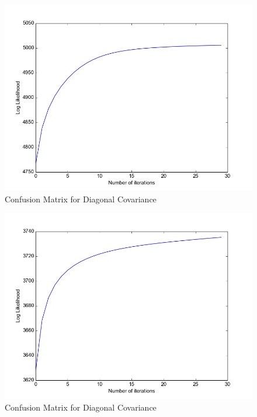 \documentclass[11pt,a4paper]{article}
\begin{document}
\begin{minipage}[b]{0.5\textwidth}
\begin{figure}[H]
  \centering
  \includegraphics[width=.8\linewidth]{Figures/likelihood_HW4.png}
\caption{Confusion Matrix for Diagonal Covariance}
  \label{fig:sfig1}
\end{figure}%
\end{minipage}
\begin{minipage}[b]{0.5\textwidth}
\begin{figure}[H]
  \centering
  \includegraphics[width=.8\linewidth]{Figures/likelihood_HW5.png}
\caption{Confusion Matrix for Diagonal Covariance}
  \label{fig:sfig1}
\end{figure}%
\end{minipage}
\end{document}
